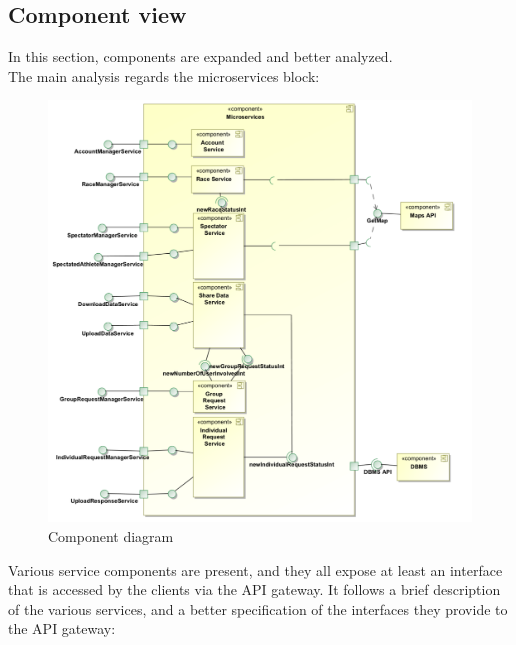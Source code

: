 \subsection{Component view}
In this section, components are expanded and better analyzed. \\
The main analysis regards the microservices block: 
\begin{figure}[H]
\includegraphics[width=\linewidth]{Images/componentdiagram.pdf}
\caption{ Component diagram }
\label{fig:componentdiagram}
\end{figure}
Various service components are present, and they all expose at least an interface that is accessed by the
clients via the API gateway. It follows a brief description of the various services, and a better
specification of the interfaces they provide to the API gateway:
